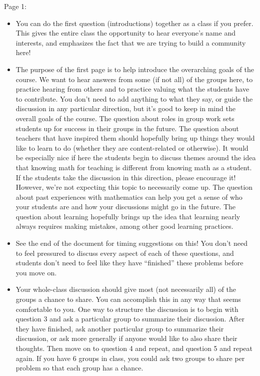 \documentclass[noauthor,nooutcomes, handout]{ximera}
\begin{document}
\begin{instructorNotes}
Page 1:
\begin{itemize}	
	\item You can do the first question (introductions) together as a class if you prefer. This gives the entire class the opportunity to hear everyone's name and interests, and emphasizes the fact that we are trying to build a community here!
	\item The purpose of the first page is to help introduce the overarching goals of the course. We want to hear answers from some (if not all) of the groups here, to practice hearing from others and to practice valuing what the students have to contribute. You don't need to add anything to what they say, or guide the discussion in any particular direction, but it's good to keep in mind the overall goals of the course. The question about roles in group work sets students up for success in their groups in the future. The question about teachers that have inspired them should hopefully bring up things they would like to learn to do (whether they are content-related or otherwise). It would be especially nice if here the students begin to discuss themes around the idea that knowing math for teaching is different from knowing math as a student. If the students take the discussion in this direction, please encourage it! However, we're not expecting this topic to necessarily come up. The question about past experiences with mathematics can help you get a sense of who your students are and how your discussions might go in the future. The question about learning hopefully brings up the idea that learning nearly always requires making mistakes, among other good learning practices.
	\item See the end of the document for timing suggestions on this! You don't need to feel pressured to discuss every aspect of each of these questions, and students don't need to feel like they have ``finished'' these problems before you move on.
	\item Your whole-class discussion should give most (not necessarily all) of the groups a chance to share. You can accomplish this in any way that seems comfortable to you. One way to structure the discussion is to begin with question 3 and ask a particular group to summarize their discussion. After they have finished, ask another particular group to summarize their discussion, or ask more generally if anyone would like to also share their thoughts. Then move on to question 4 and repeat, and question 5 and repeat again. If you have 6 groups in class, you could ask two groups to share per problem so that each group has a chance.
\end{itemize}


\end{instructorNotes}
\end{document}
